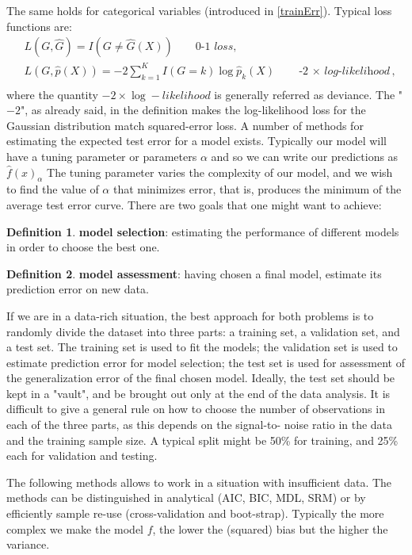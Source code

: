 \documentclass[12pt, letterpaper]{article}
\theoremstyle{definition}
\newtheorem{definition}{Definition}[section]
\begin{document}
The same holds for categorical variables (introduced in \autoref{trainErr}). Typical loss functions are:
\begin{equation}
\begin{aligned}
&L(G, \hat{G}) = I(G\ne\hat{G}(X)) \quad\quad \textit{0-1 loss},\\
&L(G, \hat{p}(X)) = -2\sum_{k=1}^K I(G=k)\log\hat{p}_k(X) \quad\quad \textit{-2 $\times$ log-likelihood},\\
\end{aligned}
\end{equation}
where the quantity $-2 \times \log-likelihood$ is generally referred as deviance. The "$-2$", as already said, in the definition makes the log-likelihood loss for the Gaussian distribution match squared-error loss.
A number of methods for estimating the expected test error for a model exists. Typically our model will have a tuning parameter or parameters $\alpha$ and so we can write our predictions as$ \hat{f}(x)_\alpha$
The tuning parameter varies the complexity of our model, and we wish to find the value of $\alpha$ that minimizes error, that is, produces the minimum of the average test error curve. There are two goals that one might want to achieve:
\begin{definition}{\textbf{model selection}}: estimating the performance of different models in order to choose the best one.
\end{definition}
\begin{definition}{\textbf{model assessment}}: having chosen a final model, estimate its prediction error on new data.
\end{definition}


If we are in a data-rich situation, the best approach for both problems is to randomly divide the dataset into three parts: a training set, a validation set, and a test set. The training set is used to fit the models; the validation set is used to estimate prediction error for model selection; the test set is used for assessment of the generalization error of the final chosen model. Ideally, the test set should be kept in a "vault", and be brought out only at the end of the data analysis. It is difficult to give a general rule on how to choose the number of observations in each of the three parts, as this depends on the signal-to- noise ratio in the data and the training sample size. A typical split might be 50\% for training, and 25\% each for validation and testing.

The following methods allows to work in a situation with insufficient data. The methods can be distinguished in analytical (AIC, BIC, MDL, SRM) or by efficiently sample re-use (cross-validation and boot-strap). 
Typically the more complex we make the model $f$, the lower the (squared) bias but the higher the variance.
\end{document}
